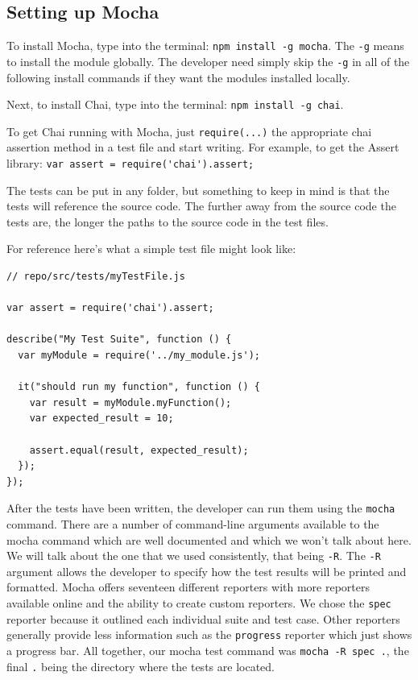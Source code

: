 \documentclass[12pt]{ucthesis}
\begin{document}
\subsection{Setting up Mocha}
To install Mocha, type into the terminal: \lstinline{npm install -g mocha}. The \lstinline{-g} means to install the module globally. The developer need simply skip the \lstinline{-g} in all of the following install commands if they want the modules installed locally.

Next, to install Chai, type into the terminal: \lstinline{npm install -g chai}.

To get Chai running with Mocha, just \lstinline{require(...)} the appropriate chai assertion method in a test file and start writing. For example, to get the Assert library: \lstinline{var assert = require('chai').assert;}

The tests can be put in any folder, but something to keep in mind is that the tests will reference the source code. The further away from the source code the tests are, the longer the paths to the source code in the test files.

For reference here's what a simple test file might look like:
\begin{lstlisting}
// repo/src/tests/myTestFile.js

var assert = require('chai').assert;

describe("My Test Suite", function () {
  var myModule = require('../my_module.js');

  it("should run my function", function () {
    var result = myModule.myFunction();
    var expected_result = 10;

    assert.equal(result, expected_result);
  });
});
\end{lstlisting}

After the tests have been written, the developer can run them using the \lstinline{mocha} command. There are a number of command-line arguments available to the mocha command which are well documented and which we won't talk about here. We will talk about the one that we used consistently, that being \lstinline{-R}. The \lstinline{-R} argument allows the developer to specify how the test results will be printed and formatted. Mocha offers seventeen different reporters with more reporters available online and the ability to create custom reporters. We chose the \lstinline{spec} reporter because it outlined each individual suite and test case. Other reporters generally provide less information such as the \lstinline{progress} reporter which just shows a progress bar. All together, our mocha test command was \lstinline{mocha -R spec .}, the final \lstinline{.} being the directory where the tests are located.
\end{document}
